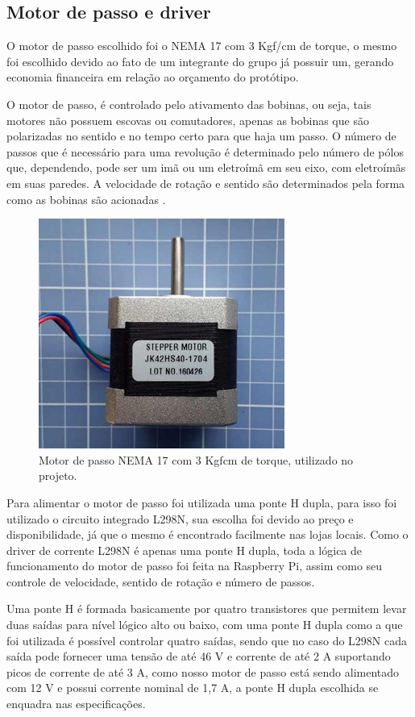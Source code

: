 \subsection{Motor de passo e driver}
O motor de passo escolhido foi o NEMA 17 com 3 Kgf/cm de torque, o mesmo foi escolhido devido ao fato de um integrante do grupo já possuir um, gerando economia financeira em relação ao orçamento do protótipo.

O motor de passo, é controlado pelo ativamento das bobinas, ou seja, tais motores não possuem escovas ou comutadores, apenas as bobinas que são polarizadas no sentido e no tempo certo para que haja um passo. O número de passos que é necessário para uma revolução é determinado pelo número de pólos que, dependendo, pode ser um imã ou um eletroímã em seu eixo, com eletroímãs em suas paredes. A velocidade de rotação e sentido são determinados pela forma como as bobinas são acionadas \cite{kalatec}.

\begin{figure}[!ht]
	\centering
		\includegraphics[scale=0.5]{figuras/eletronica/5-Motor-de-passo.jpg}
	\caption{Motor de passo NEMA 17 com 3 Kgfcm de torque, utilizado no projeto.}
\end{figure}

Para alimentar o motor de passo foi utilizada uma ponte H dupla, para isso foi utilizado o circuito integrado L298N, sua escolha foi devido ao preço e disponibilidade, já que o mesmo é encontrado facilmente nas lojas locais. Como o driver de corrente L298N é apenas uma ponte H dupla, toda a lógica de funcionamento do motor de passo foi feita na Raspberry Pi, assim como seu controle de velocidade, sentido de rotação e número de passos. 

Uma ponte H é formada basicamente por quatro transistores que permitem levar duas saídas para nível lógico alto ou baixo, com uma ponte H dupla como a que foi utilizada é possível controlar quatro saídas, sendo que no caso do L298N cada saída pode fornecer uma tensão de até 46 V e corrente de até 2 A suportando picos de corrente de até 3 A, como nosso motor de passo está sendo alimentado com 12 V e possui corrente nominal de 1,7 A, a ponte H dupla escolhida se enquadra nas especificações. 

